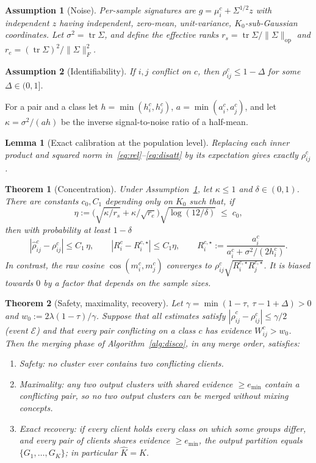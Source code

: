 \documentclass[pdflatex,sn-apa]{sn-jnl}
\theoremstyle{thmstyleone}
\newtheorem{theorem}{Theorem}
\newtheorem{lemma}{Lemma}
\theoremstyle{thmstylethree}
\newtheorem{assumption}{Assumption}
\newcommand{\tr}{\operatorname{tr}}
\newcommand{\op}{\mathrm{op}}
\newcommand{\rhohat}{\hat\rho}
\begin{document}
\begin{assumption}[Noise]\label{ass:noise}
Per-sample signatures are $g=\mu_i^c+\Sigma^{1/2}z$ with independent $z$ having independent, zero-mean, unit-variance, $K_0$-sub-Gaussian coordinates. Let $\sigma^2=\tr\Sigma$, and define the effective ranks $r_s=\tr\Sigma/\|\Sigma\|_{\op}$ and $r_e=(\tr\Sigma)^2/\|\Sigma\|_F^2$.
\end{assumption}
\begin{assumption}[Identifiability]\label{ass:sep}
If $i,j$ conflict on $c$, then $\rho^c_{ij}\le1-\Delta$ for some $\Delta\in(0,1]$.
\end{assumption}
For a pair and a class let $h=\min(h_i^c,h_j^c)$, $a=\min(a_i^c,a_j^c)$, and let $\kappa=\sigma^2/(ah)$ be the inverse signal-to-noise ratio of a half-mean.

\begin{lemma}[Exact calibration at the population level]\label{lem:pop}
Replacing each inner product and squared norm in~\eqref{eq:rel}--\eqref{eq:disatt} by its expectation gives exactly $\rho_{ij}^c$.
\end{lemma}

\begin{theorem}[Concentration]\label{thm:conc}
Under Assumption~\ref{ass:noise}, let $\kappa\le1$ and $\delta\in(0,1)$. There are constants $c_0,C_1$ depending only on $K_0$ such that, if
\[
\eta:=\Big(\sqrt{\kappa/r_s}+\kappa/\sqrt{r_e}\Big)\sqrt{\log(12/\delta)}\;\le\; c_0,
\]
then with probability at least $1-\delta$
\[
|\rhohat_{ij}^c-\rho_{ij}^c|\le C_1\,\eta,
\qquad
|R_i^c-R_i^{c,\star}|\le C_1\eta,
\qquad
R_i^{c,\star}:=\frac{a_i^c}{a_i^c+\sigma^2/(2h_i^c)}.
\]
In contrast, the raw cosine $\cos(m_i^c,m_j^c)$ converges to $\rho^c_{ij}\sqrt{R_i^{c,\star}R_j^{c,\star}}$. It is biased towards $0$ by a factor that depends on the sample sizes.
\end{theorem}

\begin{theorem}[Safety, maximality, recovery]\label{thm:rec}
Let $\gamma=\min(1-\tau,\ \tau-1+\Delta)>0$ and $w_0:=2\lambda(1-\tau)/\gamma$. Suppose that all estimates satisfy $|\rhohat^c_{ij}-\rho^c_{ij}|\le\gamma/2$ (event $\mathcal E$) and that every pair conflicting on a class $c$ has evidence $W^c_{ij}>w_0$. Then the merging phase of Algorithm~\ref{alg:disco}, in any merge order, satisfies:
\begin{enumerate}[label=(\alph*),itemsep=0pt]
\item \emph{Safety:} no cluster ever contains two conflicting clients.
\item \emph{Maximality:} any two output clusters with shared evidence $\ge e_{\min}$ contain a conflicting pair, so no two output clusters can be merged without mixing concepts.
\item \emph{Exact recovery:} if every client holds every class on which some groups differ, and every pair of clients shares evidence $\ge e_{\min}$, the output partition equals $\{G_1,\ldots,G_K\}$; in particular $\hat K=K$.
\end{enumerate}
\end{theorem}
\end{document}
